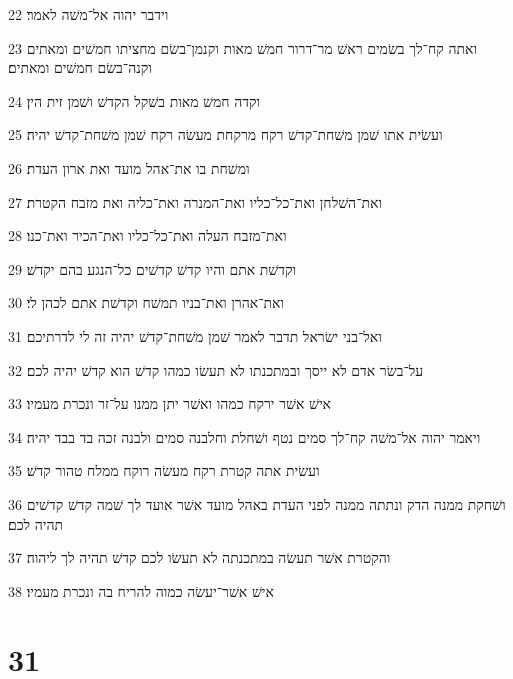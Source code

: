 \par 22 וידבר יהוה אל־משׁה לאמר׃
\par 23 ואתה קח־לך בשׂמים ראשׁ מר־דרור חמשׁ מאות וקנמן־בשׂם מחציתו חמשׁים ומאתים וקנה־בשׂם חמשׁים ומאתים׃
\par 24 וקדה חמשׁ מאות בשׁקל הקדשׁ ושׁמן זית הין׃
\par 25 ועשׂית אתו שׁמן משׁחת־קדשׁ רקח מרקחת מעשׂה רקח שׁמן משׁחת־קדשׁ יהיה׃
\par 26 ומשׁחת בו את־אהל מועד ואת ארון העדת׃
\par 27 ואת־השׁלחן ואת־כל־כליו ואת־המנרה ואת־כליה ואת מזבח הקטרת׃
\par 28 ואת־מזבח העלה ואת־כל־כליו ואת־הכיר ואת־כנו׃
\par 29 וקדשׁת אתם והיו קדשׁ קדשׁים כל־הנגע בהם יקדשׁ׃
\par 30 ואת־אהרן ואת־בניו תמשׁח וקדשׁת אתם לכהן לי׃
\par 31 ואל־בני ישׂראל תדבר לאמר שׁמן משׁחת־קדשׁ יהיה זה לי לדרתיכם׃
\par 32 על־בשׂר אדם לא ייסך ובמתכנתו לא תעשׂו כמהו קדשׁ הוא קדשׁ יהיה לכם׃
\par 33 אישׁ אשׁר ירקח כמהו ואשׁר יתן ממנו על־זר ונכרת מעמיו׃
\par 34 ויאמר יהוה אל־משׁה קח־לך סמים נטף ושׁחלת וחלבנה סמים ולבנה זכה בד בבד יהיה׃
\par 35 ועשׂית אתה קטרת רקח מעשׂה רוקח ממלח טהור קדשׁ׃
\par 36 ושׁחקת ממנה הדק ונתתה ממנה לפני העדת באהל מועד אשׁר אועד לך שׁמה קדשׁ קדשׁים תהיה לכם׃
\par 37 והקטרת אשׁר תעשׂה במתכנתה לא תעשׂו לכם קדשׁ תהיה לך ליהוה׃
\par 38 אישׁ אשׁר־יעשׂה כמוה להריח בה ונכרת מעמיו׃

\chapter{31}

